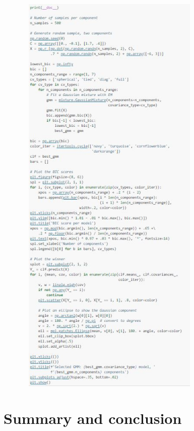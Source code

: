 \documentclass[conference]{IEEEtran}
\begin{document}
    \begin{figure}[h]
    \centering
    \includegraphics[width=9cm,height=20cm]{examplethree.JPG}
    \end{figure}
\newpage
\section{Summary and conclusion}












\newpage 



\end{document}
